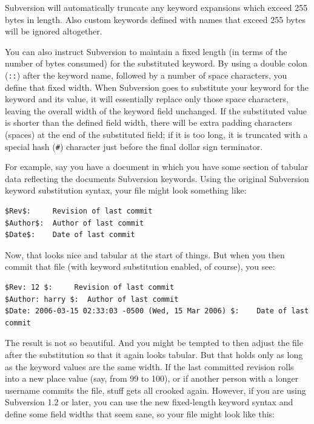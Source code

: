 Subversion will automatically truncate any keyword expansions which
exceed 255 bytes in length. Also custom keywords defined with names that
exceed 255 bytes will be ignored altogether.

You can also instruct Subversion to maintain a fixed length (in terms of
the number of bytes consumed) for the substituted keyword. By using a
double colon (\texttt{::}) after the keyword name, followed by a number
of space characters, you define that fixed width. When Subversion goes
to substitute your keyword for the keyword and its value, it will
essentially replace only those space characters, leaving the overall
width of the keyword field unchanged. If the substituted value is
shorter than the defined field width, there will be extra padding
characters (spaces) at the end of the substituted field; if it is too
long, it is truncated with a special hash (\texttt{\#}) character just
before the final dollar sign terminator.

For example, say you have a document in which you have some section of
tabular data reflecting the document\textquotesingle s Subversion
keywords. Using the original Subversion keyword substitution syntax,
your file might look something like:

\begin{verbatim}
$Rev$:     Revision of last commit
$Author$:  Author of last commit
$Date$:    Date of last commit
\end{verbatim}

Now, that looks nice and tabular at the start of things. But when you
then commit that file (with keyword substitution enabled, of course),
you see:

\begin{verbatim}
$Rev: 12 $:     Revision of last commit
$Author: harry $:  Author of last commit
$Date: 2006-03-15 02:33:03 -0500 (Wed, 15 Mar 2006) $:    Date of last commit
\end{verbatim}

The result is not so beautiful. And you might be tempted to then adjust
the file after the substitution so that it again looks tabular. But that
holds only as long as the keyword values are the same width. If the last
committed revision rolls into a new place value (say, from 99 to 100),
or if another person with a longer username commits the file, stuff gets
all crooked again. However, if you are using Subversion 1.2 or later,
you can use the new fixed-length keyword syntax and define some field
widths that seem sane, so your file might look like this:

